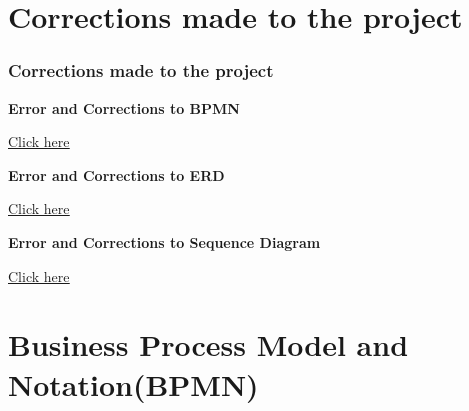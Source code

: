 \documentclass[20pt]{beamer}
\numberwithin{figure}{section}
\begin{document}
\section{Corrections made to the project}

\begin{frame}

\frametitle{Corrections made to the project}

\begin{thebibliography}{99}

\textbf{\footnotesize{Error and Corrections to BPMN}} 

\href{https://github.com/Saha-Kuljit-Shantanu/CSE_326_INFORMATION_SYSTEM_DESIGN_SESSIONAL/blob/main/BPMN_DIAGRAM_ERRORS_AND_CORRECTIONS.md}{\underline{\footnotesize{Click here}}}

\vspace{15}

\textbf{\footnotesize{Error and Corrections to ERD}} 

\href{https://github.com/Saha-Kuljit-Shantanu/CSE_326_INFORMATION_SYSTEM_DESIGN_SESSIONAL/blob/main/ER_DIAGRAM_ERRORS_AND_CORRECTIONS.md}{\underline{\footnotesize{Click here}}}

\vspace{15}

\textbf{\footnotesize{Error and Corrections to Sequence Diagram}} 

\href{https://github.com/Saha-Kuljit-Shantanu/CSE_326_INFORMATION_SYSTEM_DESIGN_SESSIONAL/blob/main/SEQUENCE_DIAGRAM_ERRORS_AND_CORRECTIONS.md}{\underline{\footnotesize{Click here}}}

\vspace{15}

\end{thebibliography}

\end{frame}


\section{Business Process Model and Notation(BPMN)}
\end{document}
